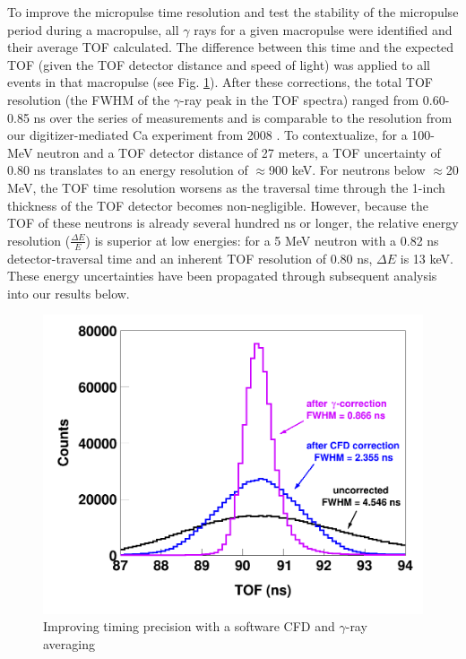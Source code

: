 To improve the micropulse time resolution and test the stability of the
micropulse period during a macropulse, all $\gamma$ rays for a given macropulse
were identified and their average TOF calculated. The difference between this
time and the expected TOF (given the TOF detector distance and speed of light)
was applied to all events in that macropulse (see Fig.
\ref{TimingCorrectionStudy}). After these corrections, the total TOF resolution
(the FWHM of the $\gamma$-ray peak in the TOF spectra) ranged from
0.60-0.85 ns over the series of \tots measurements and is comparable to the resolution from 
our digitizer-mediated Ca experiment from 2008 \cite{Shane2010}.
To contextualize, for a 100-MeV neutron and a TOF detector distance of 27 meters, a TOF 
uncertainty of 0.80 ns translates to an energy resolution of $\approx$900 keV.
For neutrons below $\approx$20 MeV, the TOF time resolution worsens as the traversal time 
through the 1-inch thickness of the TOF detector becomes non-negligible.
However, because the TOF of these neutrons is already several hundred ns or
longer, the relative energy resolution ($\frac{\Delta E}{E}$) is
superior at low energies: for a 5 MeV neutron with a 0.82 ns detector-traversal time and
an inherent TOF resolution of 0.80 ns, $\Delta E$ is 13 keV. These energy uncertainties
have been propagated through subsequent analysis into our \tots results below.

\begin{figure}
    \includegraphics[scale=0.24]{figures/TimeCorrections.png}
    \caption{Improving timing precision with a software CFD and $\gamma$-ray averaging}
    \label{TimingCorrectionStudy}
\end{figure}

